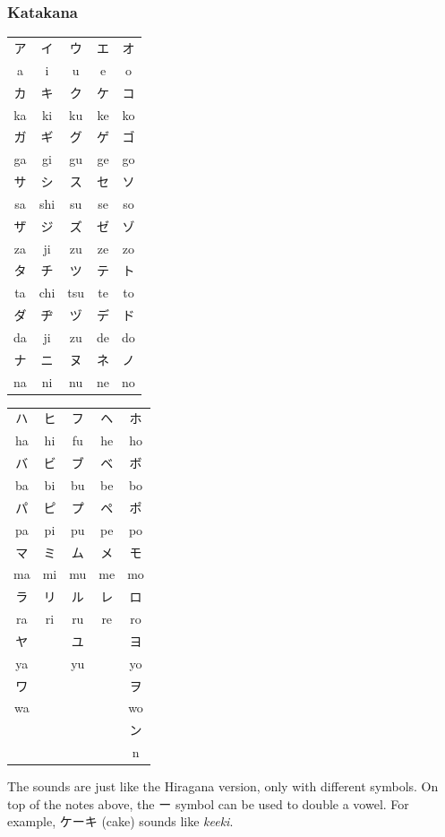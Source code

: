 \documentclass{article}
\begin{document}
\begin{CJK}{UTF8}{min}
\begin{multicols*}{3}
\subsubsection{Katakana}
\begin{tabular}{|c|c|c|c|c|}
\hline
ア&イ&ウ&エ&オ\\
a&i&u&e&o\\ \hline
カ&キ&ク&ケ&コ\\
ka&ki&ku&ke&ko\\ \hline
ガ&ギ&グ&ゲ&ゴ\\
ga&gi&gu&ge&go\\ \hline
サ&シ&ス&セ&ソ\\
sa&shi&su&se&so\\ \hline
ザ&ジ&ズ&ゼ&ゾ\\
za&ji&zu&ze&zo\\ \hline
タ&チ&ツ&テ&ト\\
ta&chi&tsu&te&to\\ \hline
ダ&ヂ&ヅ&デ&ド\\
da&ji&zu&de&do\\ \hline
ナ&ニ&ヌ&ネ&ノ\\
na&ni&nu&ne&no\\ \hline
\end{tabular}
\begin{tabular}{|c|c|c|c|c|}
\hline
ハ&ヒ&フ&ヘ&ホ\\
ha&hi&fu&he&ho\\ \hline
バ&ビ&ブ&ベ&ボ\\
ba&bi&bu&be&bo\\ \hline
パ&ピ&プ&ペ&ポ\\
pa&pi&pu&pe&po\\ \hline
マ&ミ&ム&メ&モ\\
ma&mi&mu&me&mo\\ \hline
ラ&リ&ル&レ&ロ\\
ra&ri&ru&re&ro\\ \hline
ヤ&&ユ&&ヨ\\
ya&&yu&&yo\\ \hline
ワ&&&&ヲ\\
wa&&&&wo\\ \hline
&&&&ン\\
&&&&n\\ \hline
\end{tabular}

The sounds are just like the Hiragana version, only with different symbols. On top of the notes above, the ー symbol can be used to double a vowel. For example, ケーキ (cake) sounds 
like \textit{keeki}.


\end{multicols*}
\end{CJK}
\end{document}
